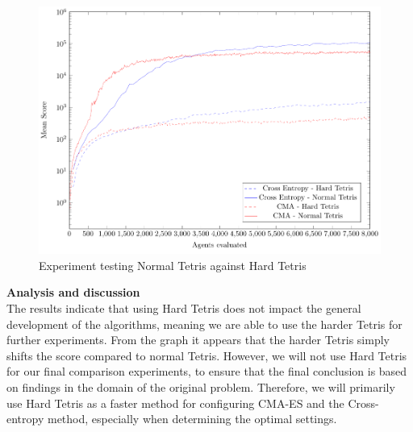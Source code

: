 \begin{figure}[H]
\centering
\includegraphics[scale=0.8]{data/complexity/mean/PlotFile.pdf}
\caption{Experiment testing Normal Tetris against Hard Tetris}
\end{figure}

\textbf{Analysis and discussion}\\
The results indicate that using Hard Tetris does not impact 
the general development of the algorithms, meaning we are 
able to use the harder Tetris for further experiments. 
From the graph it appears that the harder Tetris simply 
shifts the score compared to normal Tetris. However, we
will not use Hard Tetris for our final comparison experiments, to ensure that
the final conclusion is based on findings in the domain of the original problem. 
Therefore, we will primarily use Hard Tetris as a faster method for configuring
CMA-ES and the Cross-entropy method, especially when determining the optimal settings.
\\


